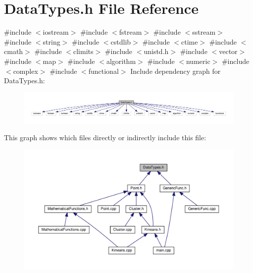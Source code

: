\section{Data\+Types.\+h File Reference}
\label{_data_types_8h}
{\ttfamily \#include $<$iostream$>$}\newline
{\ttfamily \#include $<$fstream$>$}\newline
{\ttfamily \#include $<$sstream$>$}\newline
{\ttfamily \#include $<$string$>$}\newline
{\ttfamily \#include $<$cstdlib$>$}\newline
{\ttfamily \#include $<$ctime$>$}\newline
{\ttfamily \#include $<$cmath$>$}\newline
{\ttfamily \#include $<$climits$>$}\newline
{\ttfamily \#include $<$unistd.\+h$>$}\newline
{\ttfamily \#include $<$vector$>$}\newline
{\ttfamily \#include $<$map$>$}\newline
{\ttfamily \#include $<$algorithm$>$}\newline
{\ttfamily \#include $<$numeric$>$}\newline
{\ttfamily \#include $<$complex$>$}\newline
{\ttfamily \#include $<$functional$>$}\newline
Include dependency graph for Data\+Types.\+h\+:\nopagebreak
\begin{figure}[H]
\begin{center}
\leavevmode
\includegraphics[width=350pt]{_data_types_8h__incl}
\end{center}
\end{figure}
This graph shows which files directly or indirectly include this file\+:\nopagebreak
\begin{figure}[H]
\begin{center}
\leavevmode
\includegraphics[width=350pt]{_data_types_8h__dep__incl}
\end{center}
\end{figure}
